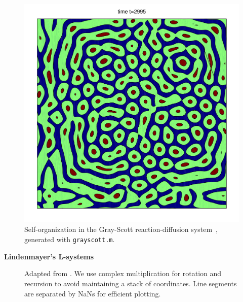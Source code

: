 \documentclass{beamer}
\def\sect#1{\textbf{\color{blue} #1}}
\begin{document}
\begin{frame}[t]{}
\begin{multicols}{5}
\begin{figure}
\end{figure}
\begin{figure}
\includegraphics[width=0.75\hsize]{grayscott.png}
\caption{Self-organization in the Gray-Scott reaction-diffusion system~\cite{pearson}, generated with \texttt{grayscott.m}.}
\end{figure}

\medskip

\sect{Lindenmayer's L-systems}

\begin{figure}
\caption{Adapted from \cite{matlabguide}. We use complex multiplication for 
rotation and recursion to avoid maintaining a stack of coordinates. 
Line segments are separated by NaNs for efficient plotting.}
\end{figure}


\end{multicols}
\end{frame}
\end{document}
